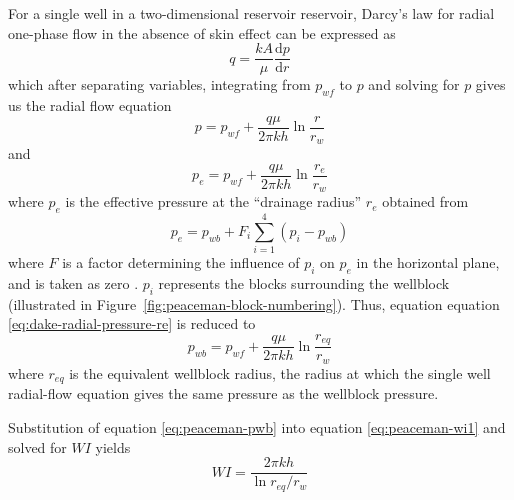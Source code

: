 For a single well in a two-dimensional reservoir reservoir, Darcy's law for radial one-phase flow in the absence of skin effect can be expressed as
\begin{equation}
    q = \frac{kA}{\mu} \frac{\mathrm{d}p}{\mathrm{d}r}
\end{equation}
which after separating variables, integrating from $p_{wf}$ to $p$ and solving for $p$ gives us the radial flow equation
\begin{equation}
    \label{eq:dake-radial-pressure}
    p = p_{wf} + \frac{q\mu}{2\pi kh} \ln{\frac{r}{r_w}}
\end{equation}
and
\begin{equation}
    \label{eq:dake-radial-pressure-re}
    p_e = p_{wf} + \frac{q\mu}{2\pi kh} \ln{\frac{r_e}{r_w}}
\end{equation}
where $p_e$ is the effective pressure at the ``drainage radius'' $r_e$ \cite{Dake1978Developments} obtained from
\begin{equation}
    \label{eq:peaceman-pe}
    p_e = p_{wb} + F_i \sum_{i=1}^{4}\left( p_i - p_{wb} \right)
\end{equation}
where $F$ is a factor determining the influence of $p_i$ on $p_e$ in the horizontal plane, and is taken as zero \cite{Schwabe1967Prediction,Peaceman1978Interpretation}. $p_i$ represents the blocks surrounding the wellblock (illustrated in Figure~\ref{fig:peaceman-block-numbering}). Thus, equation equation \eqref{eq:dake-radial-pressure-re} is reduced to
\begin{equation}
    \label{eq:peaceman-pwb}
    p_{wb} = p_{wf} + \frac{q\mu}{2\pi kh} \ln{\frac{r_{eq}}{r_w}}
\end{equation}
where $r_{eq}$ is the equivalent wellblock radius, the radius at which the single well radial-flow equation gives the same pressure as the wellblock pressure\cite{Peaceman1978Interpretation,Peaceman2003New}.

Substitution of equation \eqref{eq:peaceman-pwb} into equation \eqref{eq:peaceman-wi1} and solved for $WI$ yields
\begin{equation}
    \label{eq:peaceman-wi2}
    WI = \frac{2\pi kh}{\ln{r_{eq}/r_w}}
\end{equation}

